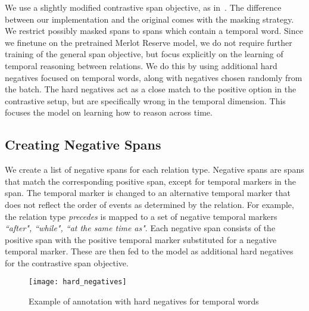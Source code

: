 We use a slightly modified contrastive span objective, as
in~\cite{zellers2022mreserve}. The difference between our implementation and
the original comes with the masking strategy. We restrict possibly masked spans
to spans which contain a temporal word. Since we finetune on the pretrained
Merlot Reserve model, we do not require further training of the general span
objective, but focus explicitly on the learning of temporal reasoning between
relations. We do this by using additional hard negatives focused on temporal
words, along with negatives chosen randomly from the batch.  The hard negatives
act as a close match to the positive option in the contrastive setup, but are
specifically wrong in the temporal dimension. This focuses the model on learning
how to reason across time.

\subsection{Creating Negative Spans}
\label{ssec:neg_labels}

We create a list of negative spans for each relation type. Negative spans are
spans that match the corresponding positive span, except for temporal markers
in the span. The temporal marker is changed to an alternative temporal marker
that does not reflect the order of events as determined by the relation. For
example, the relation type \textit{precedes} is mapped to a set of negative
temporal markers \textit{``after", ``while", ``at the same time as"}. Each
negative span consists of the positive span with the positive temporal marker
substituted for a negative temporal marker. These are then fed to the model
as additional hard negatives for the contrastive span objective.

\begin{figure}[htpb]
	\centering
	\texttt{[image: hard\_negatives]}
	\caption{Example of annotation with hard negatives for temporal words}
	\label{fig:hard_neg}
\end{figure}
